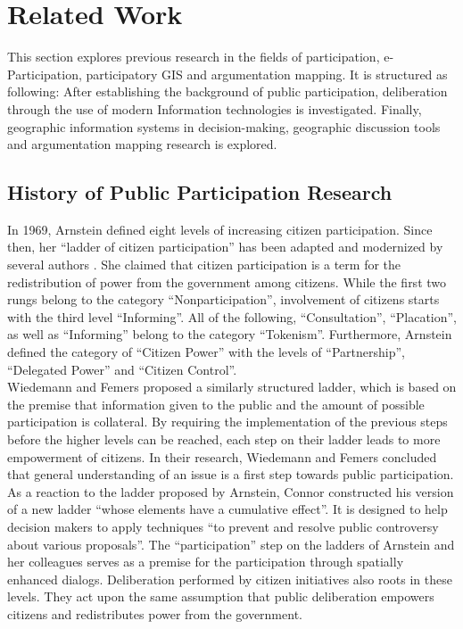 \section{Related Work}
\label{chap:related_work}
This section explores previous research in the fields of participation, e-Participation, participatory GIS and argumentation mapping. It is structured as following: After establishing the background of public participation, deliberation through the use of modern Information technologies is investigated. Finally, geographic information systems in decision-making, geographic discussion tools and argumentation mapping research is explored.


\subsection{History of Public Participation Research}
In 1969, Arnstein \cite{Arnstein1969_citizen_participation} defined eight levels of increasing citizen participation. Since then, her ``ladder of citizen participation'' has been adapted and modernized by several authors \cite{Connor1988_new_ladder,carver2003future,Collins2009_social_learning,you2009_participatory_map_based,Cai2009_spatial_annotation_deliberation,Macintosh2004_eParticipation_characterization,Schlossberg2005_PPGIS}. She claimed that citizen participation is a term for the redistribution of power from the government among citizens. While the first two rungs belong to the category ``Nonparticipation'', involvement of citizens starts with the third level ``Informing''. All of the following, ``Consultation'', ``Placation'', as well as ``Informing'' belong to the category ``Tokenism''. Furthermore, Arnstein defined the category of ``Citizen Power'' with the levels of ``Partnership'', ``Delegated Power'' and ``Citizen Control''.\\
Wiedemann and Femers \cite{Wiedemann1993355} proposed a similarly structured ladder, which is based on the premise that information given to the public and the amount of possible participation is collateral. By requiring the implementation of the previous steps before the higher levels can be reached, each step on their ladder leads to more empowerment of citizens. In their research, Wiedemann and Femers concluded that general understanding of an issue is a first step towards public participation.\\
As a reaction to the ladder proposed by Arnstein, Connor \cite{Connor1988_new_ladder} constructed his version of a new ladder ``whose elements have a cumulative effect''. It is designed to help decision makers to apply techniques ``to prevent and resolve public controversy about various proposals''. The ``participation'' step on the ladders of Arnstein and her colleagues serves as a premise for the participation through spatially enhanced dialogs. Deliberation performed by citizen initiatives also roots in these levels. They act upon the same assumption that public deliberation empowers citizens and redistributes power from the government.


